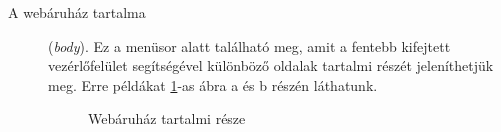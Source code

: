 \begin{description}
	\item[A webáruház tartalma] (\textit{body}). Ez a menüsor alatt található meg, amit a fentebb kifejtett vezérlőfelület segítségével különböző oldalak tartalmi részét jeleníthetjük meg. Erre példákat \ref{fig.example-3}-as ábra a és b részén láthatunk.
	\begin{figure}[H]
		\centering
		\hspace{5pt}
		\caption{Webáruház tartalmi része}
		\label{fig.example-3}
	\end{figure}
	

\end{description}
